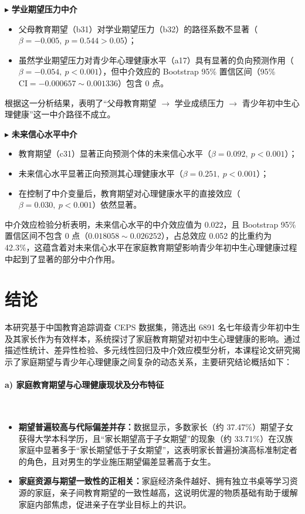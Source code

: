 \documentclass[zihao = -4, linespread = 1.5]{article}
\begin{document}
\noindent$\blacktriangleright$ \textbf{学业期望压力中介}

\begin{itemize}
    \item 父母教育期望（b31）对学业期望压力（b32）的路径系数不显著（$\beta=-0.005,\ p=0.544>0.05$）；
    \item 虽然学业期望压力对青少年心理健康水平（a17）具有显著的负向预测作用（$\beta=-0.054,\ p<0.001$），但中介效应的 Bootstrap 95\% 置信区间（95\% $\text{CI}=-0.000657\sim0.001336$）包含 0 点。
\end{itemize}

根据这一分析结果，表明了“父母教育期望 $\to$ 学业成绩压力 $\to$ 青少年初中生心理健康”这一中介路径不成立。

\noindent$\blacktriangleright$ \textbf{未来信心水平中介}

\begin{itemize}
    \item 教育期望（c31）显著正向预测个体的未来信心水平（$\beta=0.092,\ p<0.001$）；
    \item 未来信心水平显著正向预测其心理健康水平（$\beta=0.251,\ p<0.001$）；
    \item 在控制了中介变量后，教育期望对心理健康水平的直接效应（$\beta=0.030,\ p<0.001$）依然显著。
\end{itemize}

中介效应检验分析表明，未来信心水平的中介效应值为 0.022，且 Bootstrap 95\% 置信区间不包含 0 点（$0.018058\sim0.026252$），占总效应 0.052 的比重约为 42.3\%，这蕴含着对未来信心水平在家庭教育期望影响青少年初中生心理健康过程中起到了显著的部分中介作用。



\section{结论}
本研究基于中国教育追踪调查 CEPS 数据集，筛选出 6891 名七年级青少年初中生及其家长作为有效样本，系统探讨了家庭教育期望对初中生心理健康的影响。通过描述性统计、差异性检验、多元线性回归及中介效应模型分析，本课程论文研究揭示了家庭期望与青少年心理健康之间复杂的动态关系，主要研究结论概括如下：

\paragraph*{a) 家庭教育期望与心理健康现状及分布特征}~{}

\begin{itemize}
    \item \textbf{期望普遍较高与代际偏差并存：}数据显示，多数家长（约 37.47\%）期望子女获得大学本科学历，且“家长期望高于子女期望”的现象（约 33.71\%）在汉族家庭中显著多于“家长期望低于子女期望”，这表明家长普遍扮演高标准制定者的角色，且对男生的学业施压期望偏差显著高于女生。
    \item \textbf{家庭资源与期望一致性的正相关：}家庭经济条件越好、拥有独立书桌等学习资源的家庭，亲子间教育期望的一致性越高，这说明优渥的物质基础有助于缓解家庭内部焦虑，促进亲子在学业目标上的共识。
\end{itemize}
\end{document}

